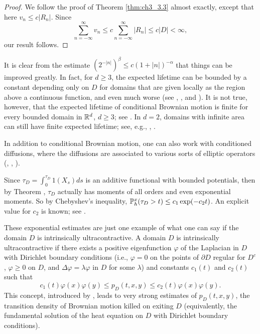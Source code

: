 \begin{proof}
We follow the proof of Theorem \ref{thm:ch3_3.3} almost exactly, except that here $v_n \leq c|R_n|$. Since
\[
    \sum_{n=-\infty}^{\infty} v_n \leq c \sum_{n=-\infty}^{\infty} |R_n| \leq c|D| < \infty,
\]
our result follows.
\end{proof}



It is clear from the estimate $(2^{-|n|})^\beta \leq c(1 + |n|)^{-\alpha}$ that things can be improved greatly. In fact, for $d \geq 3$, the expected lifetime can be bounded by a constant depending only on $D$ for domains that are given locally as the region above a continuous function, and even much worse (see \cite{Davis1991}, \cite{Banuelos1991,Banuelos1992}, and \cite{BassBurdzy1992}). It is not true, however, that the expected lifetime of conditional Brownian motion is finite for every bounded domain in $\R^d$, $d \geq 3$; see \cite{CranstonMcConnell1983}. In $d = 2$, domains with infinite area can still have finite expected lifetime; see, e.g., \cite{Xu1991}, \cite{BanuelosDavis1992}.

In addition to conditional Brownian motion, one can also work with conditioned diffusions, where the diffusions are associated to various sorts of elliptic operators (\cite{BassBurdzy1992}, \cite{Banuelos1991,Banuelos1992}, \cite{Gao1993b}).


Since $\tau_D = \int_0^{\tau_D} 1(X_s)ds$ is an additive functional with bounded potentials, then by Theorem , $\tau_D$ actually has moments of all orders and even exponential moments. So by Chebyshev's inequality, $\P_h^x(\tau_D > t) \leq c_1\exp(-c_2t)$. An explicit value for $c_2$ is known; see \cite{BanuelosDavis1989}.

These exponential estimates are just one example of what one can say if the domain $D$ is intrinsically ultracontractive. A domain $D$ is intrinsically ultracontractive if there exists a positive eigenfunction $\varphi$ of the Laplacian in $D$ with Dirichlet boundary conditions (i.e., $\varphi = 0$ on the points of $\partial D$ regular for $D^c$, $\varphi \geq 0$ on $D$, and $\Delta\varphi = \lambda\varphi$ in $D$ for some $\lambda$) and constants $c_1(t)$ and $c_2(t)$ such that
\[
    c_1(t)\varphi(x)\varphi(y) \leq p_D(t,x,y) \leq c_2(t)\varphi(x)\varphi(y).
\]
This concept, introduced by \cite{DaviesSimon1984}, leads to very strong estimates of $p_D(t,x,y)$, the transition density of Brownian motion killed on exiting $D$ (equivalently, the fundamental solution of the heat equation on $D$ with Dirichlet boundary conditions).

